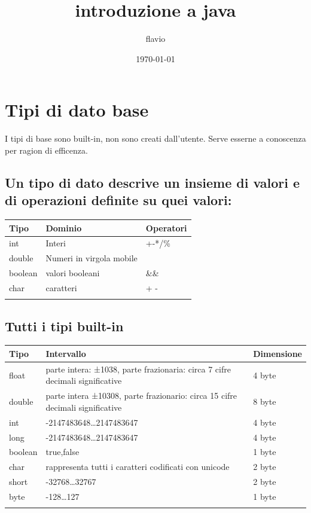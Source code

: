 \documentclass[11pt]{article}
\author{flavio}
\date{\today}
\title{introduzione a java}
\begin{document}
\maketitle
\tableofcontents

\section{Tipi di dato base}
\label{sec:org1ef7355}
I tipi di base sono built-in, non sono creati dall'utente. Serve esserne a conoscenza per ragion di efficenza.
\subsection{Un tipo di dato descrive un insieme di valori e di operazioni definite su quei valori:}
\label{sec:org1e9179f}
\begin{table}[htbp]
\label{Tipi di dato}
\centering
\begin{tabular}{lll}
Tipo & Dominio & Operatori\\
\hline
int & Interi & +-*/\%\\
double & Numeri in virgola mobile & \\
boolean & valori booleani & \&\&\\
char & caratteri & + -\\
\hline
 &  & \\
\end{tabular}
\end{table}
\subsection{Tutti i tipi built-in}
\label{sec:org55a36cb}
\begin{center}
\begin{tabular}{lll}
Tipo & Intervallo & Dimensione\\
\hline
float & parte intera: ±1038, parte frazionaria: circa 7 cifre  decimali significative & 4 byte\\
double & parte intera ±10308, parte frazionario: circa 15 cifre decimali significative & 8 byte\\
int & -2147483648…2147483647 & 4 byte\\
long & -2147483648…2147483647 & 4 byte\\
boolean & true,false & 1 byte\\
char & rappresenta tutti i caratteri codificati con unicode & 2 byte\\
short & -32768…32767 & 2 byte\\
byte & -128…127 & 1 byte\\
\hline
 &  & \\
\end{tabular}
\end{center}
\end{document}
